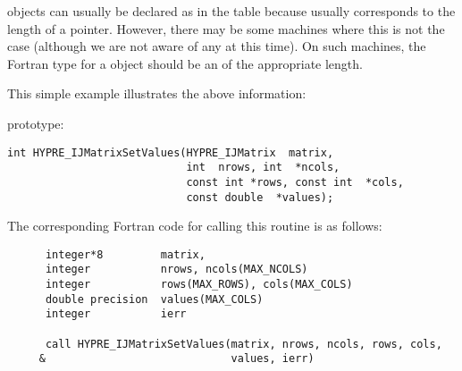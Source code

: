 \hypre{} objects can usually be declared as in the table because  
usually corresponds to the length of a pointer.  However, there may be some machines
where this is not the case (although we are not aware of any at this time).  On such
machines, the Fortran type for a \hypre{} object should be an  of
the appropriate length.

This simple example illustrates the above information: 

\hypre{} prototype:
\begin{display}
\begin{verbatim}
int HYPRE_IJMatrixSetValues(HYPRE_IJMatrix  matrix,
                            int  nrows, int  *ncols,
                            const int *rows, const int  *cols,
                            const double  *values);
\end{verbatim}
\end{display}

The corresponding Fortran code for calling this routine is as follows:
\begin{display}
\begin{verbatim}
      integer*8         matrix, 
      integer           nrows, ncols(MAX_NCOLS)
      integer           rows(MAX_ROWS), cols(MAX_COLS)
      double precision  values(MAX_COLS)
      integer           ierr

      call HYPRE_IJMatrixSetValues(matrix, nrows, ncols, rows, cols,
     &                             values, ierr)
\end{verbatim}
\end{display}

